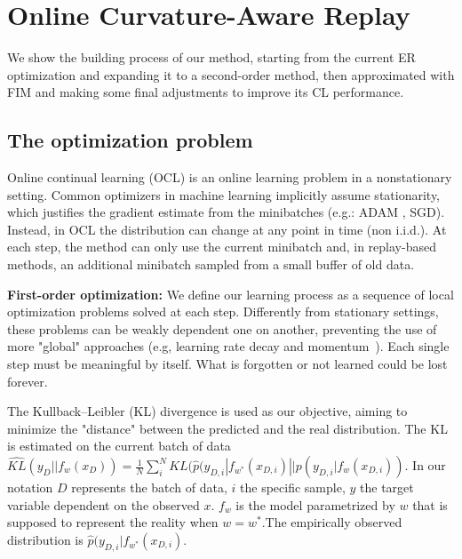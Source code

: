 


\section{Online Curvature-Aware Replay}
We show the building process of our method, starting from the current ER optimization and expanding it to a second-order method, then approximated with FIM and making some final adjustments to improve its CL performance.
\subsection{The optimization problem}
Online continual learning (OCL) is an online learning problem in a nonstationary setting. Common optimizers in machine learning implicitly assume stationarity, which justifies the gradient estimate from the minibatches (e.g.: ADAM \cite{DBLP:journals/corr/KingmaB14}, SGD). Instead, in OCL the distribution can change at any point in time (non i.i.d.). 
At each step, the method can only use the current minibatch and, in replay-based methods, an additional minibatch sampled from a small buffer of old data. 

\textbf{First-order optimization:}
We define our learning process as a sequence of local optimization problems solved at each step. Differently from stationary settings, these problems can be weakly dependent one on another, preventing the use of more "global" approaches (e.g, learning rate decay and momentum~\cite{lecun2015deep}). Each single step must be meaningful by itself. What is forgotten or not learned could be lost forever.

The Kullback–Leibler (KL) divergence \cite{thomas2006elements,lecun2015deep} is used as our objective, aiming to minimize the "distance" between the predicted and the real distribution. The KL is estimated on the current batch of data $\hat{KL}(y_D || f_w(x_D)) = \frac{1}{N} \sum_{i}^N KL(\hat{p}(y_{D, i}| f_{w^*}(x_{D, i})|| p(y_{D, i}| f_{w}(x_{D, i}))$. In our notation $D$ represents the batch of data, $i$ the specific sample, $y$ the target variable dependent on the observed $x$. $f_w$ is the model parametrized by $w$ that is supposed to represent the reality when $w=w^*$.The empirically observed distribution is $\hat{p}(y_{D, i}| f_{w^*}(x_{D, i})$.

